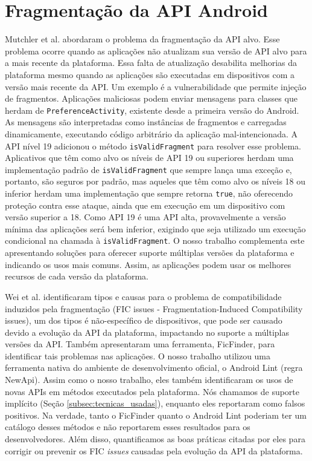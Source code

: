 \section{Fragmentação da API Android}

Mutchler et al. \cite{Mutchler2016} abordaram o problema da fragmentação da API alvo.
Esse problema ocorre quando as aplicações não atualizam sua versão de API alvo para a
mais recente da plataforma. Essa falta de atualização desabilita melhorias da plataforma
mesmo quando as aplicações são executadas em dispositivos com a versão mais recente da API.
Um exemplo é a vulnerabilidade que permite injeção de fragmentos. Aplicações maliciosas
podem enviar mensagens para classes que herdam de \texttt{PreferenceActivity}, existente
desde a primeira versão do Android. As mensagens são interpretadas como instâncias de
fragmentos e carregadas dinamicamente, executando código arbitrário da aplicação
mal-intencionada. A API nível 19 adicionou o método \texttt{isValidFragment} para resolver
esse problema. Aplicativos que têm como alvo os níveis de API 19 ou superiores herdam uma implementação padrão de \texttt{isValidFragment} que sempre lança uma exceção e, portanto,
são seguros por padrão, mas aqueles que têm como alvo os níveis 18 ou inferior herdam uma implementação que sempre retorna \texttt{true}, não oferecendo proteção contra esse ataque,
ainda que em execução em um dispositivo com versão superior a 18.  Como API 19 é uma API
alta, provavelmente a versão mínima das aplicações  será bem inferior, exigindo que seja
utilizado um execução condicional na chamada à \texttt{isValidFragment}. O nosso trabalho
complementa este apresentando soluções para oferecer suporte múltiplas versões da plataforma
e indicando os usos mais comuns. Assim, as aplicações podem usar os melhores recursos de cada
versão da plataforma. 

Wei et al. \cite{Wei2016} identificaram tipos e causas para o problema de compatibilidade
induzidos pela fragmentação (FIC issues - Fragmentation-Induced Compatibility issues), um
dos tipos é não-específico de dispositivos, que pode ser causado devido a evolução da API da
plataforma, impactando no suporte a múltiplas versões da API. Também apresentaram uma ferramenta, 
FicFinder, para identificar tais problemas nas aplicações. O nosso trabalho utilizou uma ferramenta 
nativa do ambiente de desenvolvimento oficial, o Android Lint (regra NewApi). Assim como o nosso 
trabalho, eles também identificaram os usos de novas APIs em métodos executados pela plataforma. Nós 
chamamos de suporte implícito (Seção \ref{subsec:tecnicas_usadas}), enquanto eles reportaram como 
falsos positivos. Na verdade, tanto o FicFinder quanto o Android Lint poderiam ter um catálogo desses 
métodos e não reportarem esses resultados para os desenvolvedores. Além disso, quantificamos as boas 
práticas citadas por eles para corrigir ou prevenir os FIC \textit{issues} causadas pela evolução da API da plataforma.

